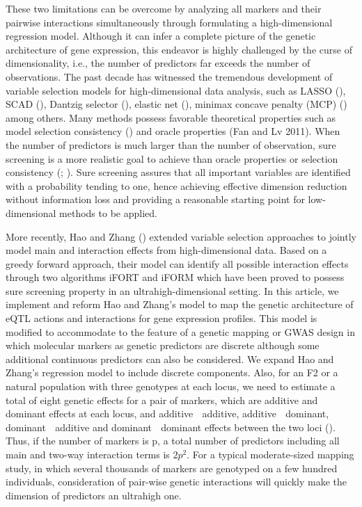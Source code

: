 \documentclass[]{book}
\theoremstyle{definition}
\theoremstyle{definition}
\theoremstyle{remark}
\begin{document}
These two limitations can be overcome by analyzing all markers and their
pairwise interactions simultaneously through formulating a
high-dimensional regression model. Although it can infer a complete
picture of the genetic architecture of gene expression, this endeavor is
highly challenged by the curse of dimensionality, i.e., the number of
predictors far exceeds the number of observations. The past decade has
witnessed the tremendous development of variable selection models for
high-dimensional data analysis, such as LASSO
(\cite{tibshirani1996regression}), SCAD (\cite{fan2001variable}),
Dantzig selector (\cite{candes2007dantzig}), elastic net
(\cite{zhao2006model}), minimax concave penalty (MCP)
(\cite{zhang2010nearly}) among others. Many methods possess favorable
theoretical properties such as model selection consistency
(\cite{zhao2006model}) and oracle properties (Fan and Lv 2011). When the
number of predictors is much larger than the number of observation, sure
screening is a more realistic goal to achieve than oracle properties or
selection consistency (\cite{fan2008sure}; \cite{wang2009forward}). Sure
screening assures that all important variables are identified with a
probability tending to one, hence achieving effective dimension
reduction without information loss and providing a reasonable starting
point for low-dimensional methods to be applied.

More recently, Hao and Zhang (\cite{hao2014interaction}) extended
variable selection approaches to jointly model main and interaction
effects from high-dimensional data. Based on a greedy forward approach,
their model can identify all possible interaction effects through two
algorithms iFORT and iFORM which have been proved to possess sure
screening property in an ultrahigh-dimensional setting. In this article,
we implement and reform Hao and Zhang's model to map the genetic
architecture of eQTL actions and interactions for gene expression
profiles. This model is modified to accommodate to the feature of a
genetic mapping or GWAS design in which molecular markers as genetic
predictors are discrete although some additional continuous predictors
can also be considered. We expand Hao and Zhang's regression model to
include discrete components. Also, for an F2 or a natural population
with three genotypes at each locus, we need to estimate a total of eight
genetic effects for a pair of markers, which are additive and dominant
effects at each locus, and additive  additive, additive  dominant,
dominant  additive and dominant  dominant effects between the two loci
(\cite{kempthorne1968correlation}). Thus, if the number of markers is p,
a total number of predictors including all main and two-way interaction
terms is \(2p^2\). For a typical moderate-sized mapping study, in which
several thousands of markers are genotyped on a few hundred individuals,
consideration of pair-wise genetic interactions will quickly make the
dimension of predictors an ultrahigh one.
\end{document}
